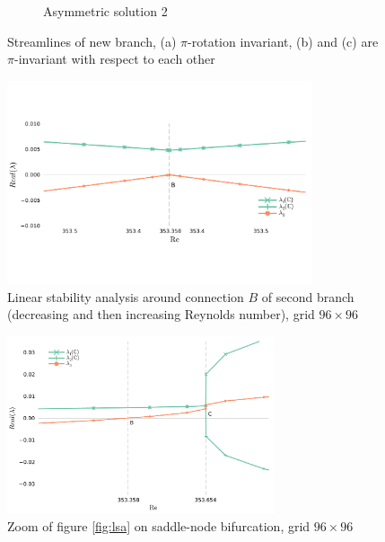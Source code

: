 \begin{figure}[h!]
\begin{subfigure}[b]{0.25\textwidth}
  \caption{Asymmetric solution 2}
\end{subfigure}
\caption{Streamlines of new branch, (a) $\pi$-rotation invariant, (b) and (c)
  are $\pi$-invariant with respect to each other}
\label{fig:sol_branch2}
\end{figure}

\begin{figure}[h!]
  \centering
  \includegraphics[trim={0 2.5cm 0 1cm},clip,width=0.8\textwidth]{figs/lsa_branch2_96x96.pdf}
  \caption{Linear stability analysis around connection $B$ of second branch
  (decreasing and then increasing Reynolds number), grid $96 \times 96$}
  \label{fig:lsa_branch2}
\end{figure}


\begin{figure}[h!]
  \centering
  \includegraphics[width=0.7\textwidth]{figs/lsa_sn_zoom96x96.pdf}
  \caption{Zoom of figure \ref{fig:lsa} on saddle-node bifurcation, grid $96
    \times 96$} 
  \label{fig:lsa_zoom}
\end{figure}

